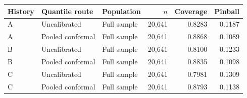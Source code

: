 \begin{tabular}{@{}lllrrr@{}}
\toprule
History & Quantile route & Population & $n$ & Coverage & Pinball \\
\midrule
A & Uncalibrated & Full sample & 20,641 & 0.8283 & 0.1187 \\
A & Pooled conformal & Full sample & 20,641 & 0.8868 & 0.1089 \\
B & Uncalibrated & Full sample & 20,641 & 0.8100 & 0.1233 \\
B & Pooled conformal & Full sample & 20,641 & 0.8835 & 0.1098 \\
C & Uncalibrated & Full sample & 20,641 & 0.7981 & 0.1309 \\
C & Pooled conformal & Full sample & 20,641 & 0.8793 & 0.1138 \\
\bottomrule
\end{tabular}
